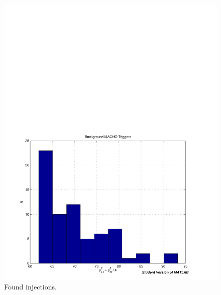 \begin{figure}[p]
\begin{center}
\includegraphics[width=\textwidth]{analysis/figures/bkg_hist}
\end{center}
\caption{\label{f:pipeline}%
Found injections.
}
\end{figure}

